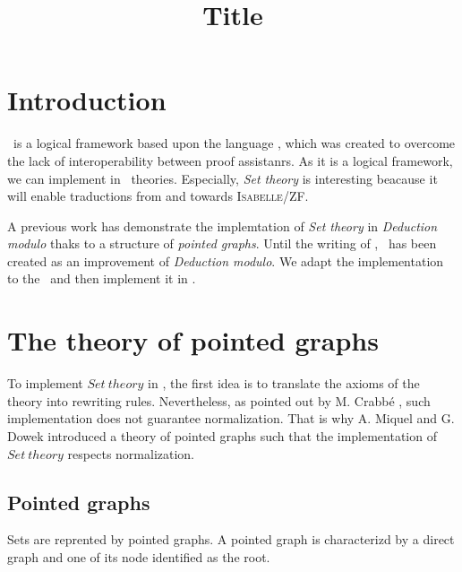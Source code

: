 \documentclass[a4paper]{article}
\title{Title}
\date{}
\begin{document}
\thispagestyle{empty}
\maketitle

\section{Introduction}

\dedukti \ is a logical framework based upon the language \lpcm, which was created to overcome the lack of interoperability between proof assistanrs. As it is a logical framework, we can implement in \dedukti \ theories. Especially, \textit{Set theory} is interesting beacause it will enable traductions from and towards \textsc{Isabelle/ZF}.

A previous work \cite{zermodulo} has demonstrate the implemtation of \textit{Set theory} in \textit{Deduction modulo} thaks to a structure of \textit{pointed graphs}. Until the writing of \cite{zermodulo}, \lpcm \ has been created as an improvement of \textit{Deduction modulo}. We adapt the implementation to the \lpcm \ and then implement it in \dedukti. 

\section{The theory of pointed graphs}

To implement $Set \ theory$ in \dedukti, the first idea is to translate the axioms of the theory into rewriting rules. Nevertheless, as pointed out by M. Crabbé \cite{crabbé}, such implementation does not guarantee normalization. That is why A. Miquel and G. Dowek \cite{zermodulo} introduced a theory of pointed graphs such that the implementation of $Set~theory$ respects normalization.

\subsection{Pointed graphs}

Sets are reprented by pointed graphs. A pointed graph is characterizd by a direct graph and one of its node identified as the root. 

\begin{figure}[h]
\end{figure}
\end{document}
